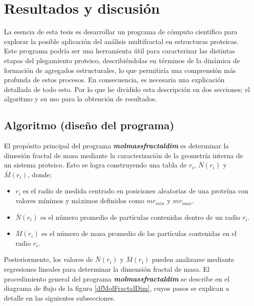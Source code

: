 \chapter{Resultados y discusión}

La esencia de esta tesis es desarrollar un programa de cómputo científico para explorar la posible aplicación del análisis multifractal en estructuras proteicas. Este programa podría ser una herramienta útil para caracterizar las distintas etapas del plegamiento proteico, describiéndolas en términos de la dinámica de formación de agregados estructurales, lo que permitiría una comprensión más profunda de estos procesos. En consecuencia, es necesaria una explicación detallada de todo esto. Por lo que he dividido esta descripción en dos secciones; el algoritmo y su uso para la obtención de resultados. 
 
 
\section{Algoritmo (diseño del programa)}

El propósito principal del programa \textbf{\textit{molmassfractaldim}} es determinar la dimesi\'{o}n fractal de masa mediante la caracterizaci\'{o}n de la geometría interna de un sistema proteico. Esto se logra construyendo una tabla de \(r_i\), \( \bar{N}(r_i)\) y \( \bar{M}(r_i)\), donde;

\begin{itemize}
	\item \(r_i\) es el radio de medida centrado en posiciones aleatorias de una prote\'{i}na con valores m\'{i}nimos y m\'{a}ximos definidos como \(mr_{min}\) y \(mr_{max}\).
	\item \( \bar{N}(r_i)\) es el número promedio de partículas contenidas dentro de un radio \(r_i\). 
	\item  \( \bar{M}(r_i)\) es el n\'{u}mero de masa promedio de las part\'{i}culas contenidas en el radio \(r_i\).
\end{itemize}

Posteriormente, los valores de \( \bar{N}(r_i) \) y \( \bar{M}(r_i)\) pueden analizarse mediante regresiones lineales para determinar la dimensi\'{o}n fractal de masa. El procedimiento general del programa \textbf{\textit{molmassfractaldim}} se describe en el diagrama de flujo de la figura \ref{dfMolFractalDim}, cuyos pasos se explican a detalle en las siguientes subsecciones.
 
